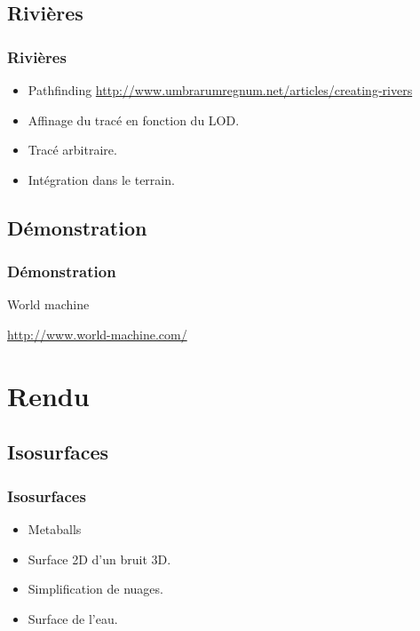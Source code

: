 \documentclass[hyperref={pdfpagelabels=false}]{beamer}
\begin{document}
\subsection{Rivières}

\begin{frame}
  \frametitle{Rivières}
  \begin{itemize}
  \item<1-> Pathfinding {\tiny\url{http://www.umbrarumregnum.net/articles/creating-rivers}}
  \item<2-4> Affinage du tracé en fonction du LOD.
  \item<5-> Tracé arbitraire.
  \item<6-> Intégration dans le terrain.
  \end{itemize}
\end{frame}

\subsection{Démonstration}
\begin{frame}
  \frametitle{Démonstration}
  \begin{center}
  {\Huge World machine}
  
  \vspace{1em}
  \url{http://www.world-machine.com/}
  \end{center}
\end{frame}

\section{Rendu}

\subsection{Isosurfaces}
\begin{frame}
  \frametitle{Isosurfaces}
  \begin{itemize}
    \item Metaballs %
    \item Surface 2D d'un bruit 3D.
    \item Simplification de nuages.
    \item Surface de l'eau.
  \end{itemize}
\end{frame}
\end{document}
